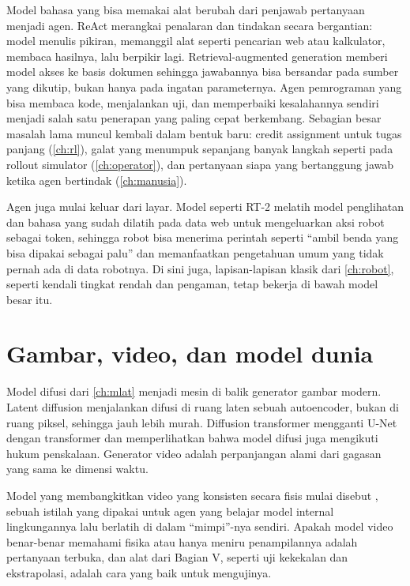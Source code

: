 Model bahasa yang bisa memakai alat berubah dari penjawab pertanyaan menjadi agen. ReAct \citep{yao2023}
merangkai penalaran dan tindakan secara bergantian: model menulis pikiran, memanggil alat seperti
pencarian web atau kalkulator, membaca hasilnya, lalu berpikir lagi. Retrieval-augmented generation
\citep{lewis2020} memberi model akses ke basis dokumen sehingga jawabannya bisa bersandar pada sumber yang
dikutip, bukan hanya pada ingatan parameternya. Agen pemrograman yang bisa membaca kode, menjalankan uji,
dan memperbaiki kesalahannya sendiri menjadi salah satu penerapan yang paling cepat berkembang. Sebagian
besar masalah lama muncul kembali dalam bentuk baru: credit assignment untuk tugas panjang (\cref{ch:rl}),
galat yang menumpuk sepanjang banyak langkah seperti pada rollout simulator (\cref{ch:operator}), dan
pertanyaan siapa yang bertanggung jawab ketika agen bertindak (\cref{ch:manusia}).

Agen juga mulai keluar dari layar. Model  seperti RT-2 \citep{brohan2023} melatih model
penglihatan dan bahasa yang sudah dilatih pada data web untuk mengeluarkan aksi robot sebagai token, sehingga robot bisa
menerima perintah seperti ``ambil benda yang bisa dipakai sebagai palu'' dan memanfaatkan pengetahuan umum yang tidak
pernah ada di data robotnya. Di sini juga, lapisan-lapisan klasik dari \cref{ch:robot}, seperti kendali tingkat rendah dan
pengaman, tetap bekerja di bawah model besar itu.

\section{Gambar, video, dan model dunia}

Model difusi dari \cref{ch:mlat} menjadi mesin di balik generator gambar modern. Latent diffusion
\citep{rombach2022} menjalankan difusi di ruang laten sebuah autoencoder, bukan di ruang piksel, sehingga
jauh lebih murah. Diffusion transformer \citep{peebles2023} mengganti U-Net dengan transformer dan
memperlihatkan bahwa model difusi juga mengikuti hukum penskalaan. Generator video adalah perpanjangan
alami dari gagasan yang sama ke dimensi waktu.

Model yang membangkitkan video yang konsisten secara fisis mulai disebut , sebuah
istilah yang dipakai \citet{ha2018} untuk agen yang belajar model internal lingkungannya lalu berlatih di
dalam ``mimpi''-nya sendiri. Apakah model video benar-benar memahami fisika atau hanya meniru
penampilannya adalah pertanyaan terbuka, dan alat dari Bagian V, seperti uji kekekalan dan ekstrapolasi,
adalah cara yang baik untuk mengujinya.

